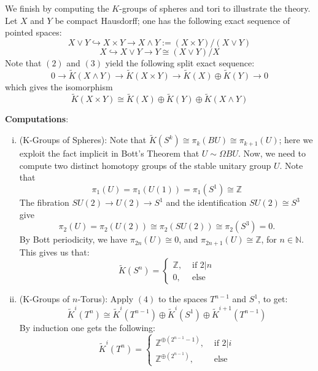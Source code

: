 \documentclass[11pt,a4paper]{article}
\begin{document}
We finish by computing the $K$-groups of spheres and tori to illustrate the theory. Let $X$ and $Y$ be compact Hausdorff; one has the following exact sequence of pointed spaces:
\begin{equation}\tag{2}
    X\vee Y \hookrightarrow X\times Y \rightarrow X\wedge Y:= (X\times Y)/(X\vee Y)
\end{equation}
\begin{equation}\tag{3}
    X\hookrightarrow X\vee Y \rightarrow Y \cong (X\vee Y)/X
\end{equation}
Note that $(2)$ and $(3)$ yield the following split exact sequence:
$$0\rightarrow \widetilde{K}(X\wedge Y) \rightarrow \widetilde{K}(X\times Y) \rightarrow \widetilde{K}(X)\oplus \widetilde{K}(Y) \xrightarrow{} 0$$
which gives the isomorphism
\begin{equation}\tag{4}
    \widetilde{K}(X\times Y) \cong \widetilde{K}(X)\oplus \widetilde{K}(Y)\oplus \widetilde{K}(X\wedge Y)
\end{equation}


\textbf{Computations}:
\begin{enumerate}[(i)]
    \item (K-Groups of Spheres): Note that $\widetilde{K}(S^k) \cong \pi_k(BU) \cong \pi_{k+1}(U)$; here we exploit the fact implicit in Bott's Theorem that $U\sim \Omega BU$. Now, we need to compute two distinct homotopy groups of the stable unitary group $U$. Note that
    $$\pi_1(U) = \pi_1(U(1)) = \pi_1(S^1) \cong \mathbb{Z}$$
    The fibration $SU(2)\rightarrow U(2)\rightarrow S^1$ and the identification $SU(2)\cong S^3$ give
    $$\pi_2(U) = \pi_2(U(2)) \cong \pi_2(SU(2)) \cong \pi_2(S^3) = 0.$$
    By Bott periodicity, we have $\pi_{2n}(U) \cong 0$, and $\pi_{2n+1}(U) \cong \mathbb{Z}$, for $n\in \mathbb{N}$. This gives us that:
    $$\widetilde{K}(S^n) = \begin{cases}
        \mathbb{Z}, &\text{ if }2|n\\
        0, & \text{ else}
    \end{cases}$$
    \item (K-Groups of $n$-Torus): Apply $(4)$ to the spaces $T^{n-1}$ and $S^1$, to get:
    $$\widetilde{K}^i(T^n) \cong \widetilde{K}^i(T^{n-1})\oplus \widetilde{K}^i(S^1)\oplus \widetilde{K}^{i+1}(T^{n-1})$$
    By induction one gets the following:
    $$\widetilde{K}^i(T^n)= \begin{cases}
        \mathbb{Z}^{\oplus(2^{n-1} -1)}, & \text{ if } 2|i\\
        \mathbb{Z}^{\oplus(2^{n-1})}, & \text{ else}
    \end{cases}$$
\end{enumerate}
\end{document}
